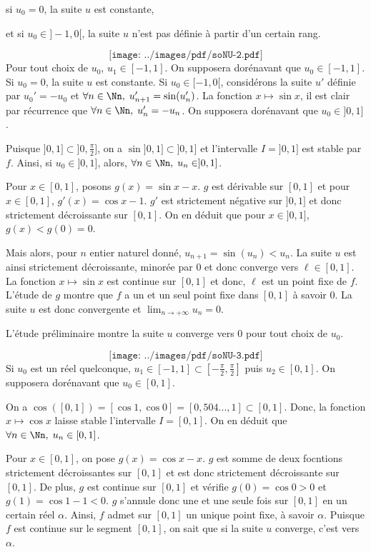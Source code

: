 {{si $u_0=0$, la suite $u$ est constante,

et si $u_0\in]-1,0[$, la suite $u$ n'est pas définie à partir d'un certain rang.

$$\texttt{[image: ../images/pdf/soNU-2.pdf]}$$
Pour tout choix de $u_0$, $u_1\in[-1,1]$. On supposera dorénavant que $u_0\in[-1,1]$. Si $u_0=0$, la suite $u$ est constante. Si $u_0\in[-1,0[$, considérons la suite $u'$ définie par $u_0'=-u_0$ et $\forall n\in\Nn,\;u_{n+1}'=\sin(u_n')$. La fonction $x\mapsto\sin x$, il est clair par récurrence que $\forall n\in\Nn,\;u_n'=-u_n$. On supposera dorénavant que $u_0\in]0,1]$.

Puisque $]0,1]\subset]0,\frac{\pi}{2}]$, on a $\sin]0,1]\subset]0,1]$ et l'intervalle $I=]0,1]$ est stable par $f$. Ainsi, si $u_0\in]0,1]$, alors, $\forall n\in\Nn,\;u_n\in]0,1]$.

Pour $x\in[0,1]$, posons $g(x)=\sin x-x$. $g$ est dérivable sur $[0,1]$ et pour $x\in[0,1]$, $g'(x)=\cos x-1$. $g'$ est strictement négative sur $]0,1]$ et donc strictement décroissante sur $[0,1]$. On en déduit que pour $x\in]0,1]$, $g(x)<g(0)=0$.

Mais alors, pour $n$ entier naturel donné, $u_{n+1}=\sin(u_n)<u_n$. La suite $u$ est ainsi strictement décroissante, minorée par $0$ et donc converge vers $\ell\in[0,1]$. La fonction $x\mapsto\sin x$ est continue sur $[0,1]$ et donc, $\ell$ est un point fixe de $f$. L'étude de $g$ montre que $f$ a un et un seul point fixe dans $[0,1]$ à savoir $0$. La suite $u$ est donc convergente et $\lim_{n\rightarrow +\infty}u_n=0$.

L'étude préliminaire montre la suite $u$ converge vers $0$ pour tout choix de $u_0$.

$$\texttt{[image: ../images/pdf/soNU-3.pdf]}$$
Si $u_0$ est un réel quelconque, $u_1\in[-1,1]\subset[-\frac{\pi}{2},\frac{\pi}{2}]$ puis $u_2\in[0,1]$. On supposera dorénavant que $u_0\in[0,1]$.

On a $\cos([0,1])=[\cos 1,\cos0]=[0,504...,1]\subset[0,1]$. Donc, la fonction $x\mapsto\cos x$ laisse stable l'intervalle $I=[0,1]$. On en déduit que $\forall n\in\Nn,\;u_n\in[0,1]$.

Pour $x\in[0,1]$, on pose $g(x)=\cos x-x$. $g$ est somme de deux focntions strictement décroissantes sur $[0,1]$ et est donc strictement décroissante sur $[0,1]$. De plus, $g$ est continue sur $[0,1]$ et vérifie $g(0)=\cos0>0$ et $g(1)=\cos1-1<0$. $g$ s'annule donc une et une seule fois sur $[0,1]$ en un certain réel $\alpha$. Ainsi, $f$ admet sur $[0,1]$ un unique point fixe, à savoir $\alpha$. Puisque $f$ est continue sur le segment $[0,1]$, on sait que si la suite $u$ converge, c'est vers $\alpha$.

}}
